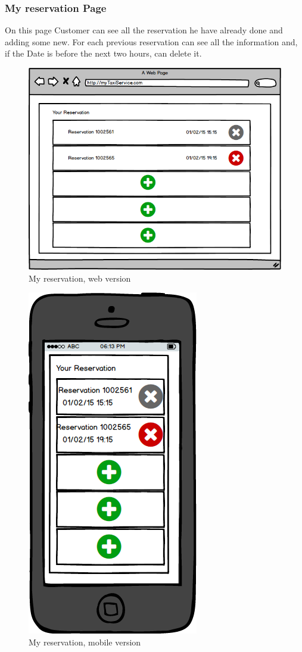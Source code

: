 \documentclass{report}
\begin{document}
			\subsubsection{My reservation Page}
			On this page Customer can see all the reservation he have already done and adding some new. For each previous reservation can see all the information and, if the Date is before the 				next two hours, can delete it.			
			
				\begin{figure}[H]
					\centering
					\includegraphics[scale=0.5]{IMG/UserInterfaces/myReservation.png}
					\caption{My reservation, web version}\label{visina8}
				\end{figure}
				\begin{figure}[H]
					\centering
					\includegraphics[scale=0.4]{IMG/UserInterfaces/myReservation_m.png}
					\caption{My reservation, mobile version}\label{visina8}
				\end{figure}
			
\end{document}

